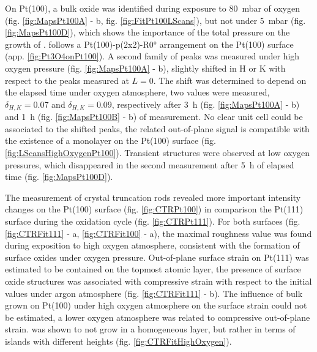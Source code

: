 On Pt(100), a bulk  oxide was identified during exposure to \qty{80}{\milli\bar} of oxygen (fig. \ref{fig:MapsPt100A} - b, fig. \ref{fig:FitPt100LScans}), but not under \qty{5}{\milli\bar} (fig. \ref{fig:MapsPt100D}), which shows the importance of the total pressure on the growth of .
 follows a Pt(100)-p(2x2)-R\ang{0} arrangement on the Pt(100) surface (app. \ref{fig:Pt3O4onPt100}).
A second family of peaks was measured under high oxygen pressure (fig. \ref{fig:MapsPt100A} - b), slightly shifted in H or K with respect to the  peaks measured at $L=0$.
The shift was determined to depend on the elapsed time under oxygen atmosphere, two values were measured, $\delta_{H,K}=0.07$ and $\delta_{H,K}=0.09$, respectively after \qty{3}{\hour} (fig. \ref{fig:MapsPt100A} - b) and \qty{1}{\hour} (fig. \ref{fig:MapsPt100B} - b) of measurement.
No clear unit cell could be associated to the shifted peaks, the related out-of-plane signal is compatible with the existence of a monolayer on the Pt(100) surface (fig. \ref{fig:LScansHighOxygenPt100}).
Transient structures were observed at low oxygen pressures, which disappeared in the second measurement after \qty{5}{\hour} of elapsed time (fig. \ref{fig:MapsPt100D}).

The measurement of crystal truncation rods revealed more important intensity changes on the Pt(100) surface (fig. \ref{fig:CTRPt100}) in comparison the Pt(111) surface during the oxidation cycle (fig. \ref{fig:CTRPt111}).
For both surfaces (fig. \ref{fig:CTRFit111} - a, \ref{fig:CTRFit100} - a), the maximal roughness value was found during exposition to high oxygen atmosphere, consistent with the formation of surface oxides under oxygen pressure.
Out-of-plane surface strain on Pt(111) was estimated to be contained on the topmost atomic layer, the presence of surface oxide structures was associated with compressive strain with respect to the initial values under argon atmosphere (fig. \ref{fig:CTRFit111} - b).
The influence of bulk  grown on Pt(100) under high oxygen atmosphere on the surface strain could not be estimated, a lower oxygen atmosphere was related to compressive out-of-plane strain.
 was shown to not grow in a homogeneous layer, but rather in terms of islands with different heights (fig. \ref{fig:CTRFitHighOxygen}).

